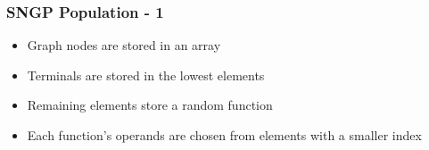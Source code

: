 \documentclass{beamer}
\begin{document}
		\begin{frame}
		
			\frametitle{SNGP Population - 1}
			
					
			\begin{itemize}
				\pause
				\item Graph nodes are stored in an array
				\pause
				\item Terminals are stored in the lowest elements
				\pause
				\item Remaining elements store a random function
				\pause
				\item Each function's operands are chosen from elements with a smaller index
			\end{itemize}
				
		
		\end{frame}
	
\end{document}
